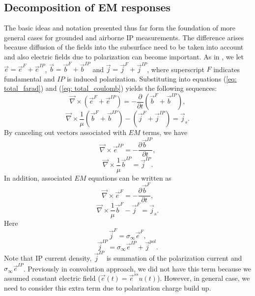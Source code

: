 \documentclass[a4paper, 11pt]{article}
\newcommand{\curl}{{\vec \nabla}\times}
\newcommand{\siginf}{\sigma_\infty}
\renewcommand {\j}  { {\vec j} }
\renewcommand {\b}  { {\vec b} }
\newcommand {\e}  { {\vec e} }
\begin{document}
\subsection{Decomposition of EM responses}
The basic ideas and notation presented thus far form the foundation of more general cases for grounded and airborne IP measurements. The difference arises because diffusion of the fields into the subsurface need to be taken into account and also electric fields due to polarization can become important. As in \cite{Smith1988a}, we let $\e = \e^{F} + \e^{IP}$, $\b = \b^{F} + \b^{IP}$ and $\j = \j^{F} + \j^{IP}$, where superscript $F$ indicates fundamental and $IP$ is induced polarization.
Substituting into equations (\ref{eq: total_farad}) and (\ref{eq: total_coulomb}) yields the following sequences:
\begin{equation}
  \curl({\e^{F}+\e^{IP}}) = -\frac{\partial}{\partial t} (\b^{F}+\b^{IP}),
\end{equation}
\begin{equation}
  \curl\frac{1}{\mu}(\b^{F}+\b^{IP}) - (\j^{F}+\j^{IP})= \j_{s}.
\end{equation}
By canceling out vectors associated with $EM$ terms, we have
\begin{equation}
  \curl \e^{IP} = -\frac{\partial \b^{IP}}{\partial t},
  \label{eq: eq_secondary_farad}
\end{equation}
\begin{equation}
  \curl{\frac{1}{\mu}\b^{IP}} = \j^{IP}.
  \label{eq: eq_secondary_coulomb}
\end{equation}
In addition, associated $EM$ equations can be written as
\begin{equation}
  \curl \e^{F} = -\frac{\partial \b^{F}}{\partial t},
  \label{eq: eq_primary_farad}
\end{equation}
\begin{equation}
  \curl{\frac{1}{\mu}\b^{F}} -\j^{F} = \j_s.
  \label{eq: eq_primary_coulomb}
\end{equation}
Here
\begin{equation}
  \j^{F} = \siginf\e^{F},
  \label{eq: jF}
\end{equation}
\begin{equation}
  \j^{IP} = \siginf\e^{IP} + \j^{pol}.
  \label{eq: jIP}
\end{equation}
Note that IP current density, $\j^{IP}$ is summation of the polarization current and $\siginf\e^{IP}$. Previously in convolution approach, we did not have this term because we assumed constant electric field ($\e(t) = \e^{ss}u(t)$). However, in general case, we need to consider this extra term due to polarization charge build up.
\end{document}
